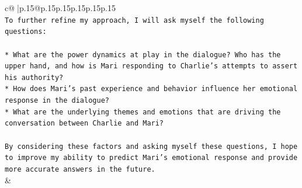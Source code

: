 \documentclass{article}
\begin{document}
{\begin{supertabular}{c@{$\;$}|p{.15\linewidth}@{}p{.15\linewidth}p{.15\linewidth}p{.15\linewidth}p{.15\linewidth}p{.15\linewidth}}
{{{\\ 
\texttt{To further refine my approach, I will ask myself the following questions:} \\
\\ 
\texttt{* What are the power dynamics at play in the dialogue? Who has the upper hand, and how is Mari responding to Charlie's attempts to assert his authority?} \\
\texttt{* How does Mari's past experience and behavior influence her emotional response in the dialogue?} \\
\texttt{* What are the underlying themes and emotions that are driving the conversation between Charlie and Mari?} \\
\\ 
\texttt{By considering these factors and asking myself these questions, I hope to improve my ability to predict Mari's emotional response and provide more accurate answers in the future.} \\
            }
        }
    }
    & \\ \\

\end{supertabular}
}
\end{document}
